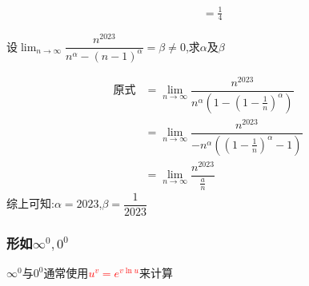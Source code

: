 \documentclass[8pt a4paper, oneside, UTF8]{ctexbook}
\begin{document}
\begin{sloppypar}
\begin{solution}
\begin{align*}
            & = \frac{1}{4}
        \end{align*}
    \end{solution}
    \begin{problem}
        设$\lim_{n\to\infty}\dfrac{n^{2023}}{n^{\alpha}-(n-1)^{\alpha}}=\beta\neq0$,求$\alpha$及$\beta$
    \end{problem}
    \begin{solution}
        \begin{align*}
          \text{原式} & = \lim_{n\to\infty} \dfrac{n^{2023}}{n^\alpha(1-(1-\frac{1}{n})^\alpha)}\\
          & = \lim_{n\to\infty} \dfrac{n^{2023}}{-n^\alpha((1-\frac{1}{n})^\alpha-1)}\\
          & = \lim_{n \to \infty} \dfrac{n^{2023}}{\frac{a}{n}}
        \end{align*}
        综上可知:$\alpha =2023$,$\beta=\dfrac{1}{2023}$
    \end{solution}
    \subsubsection{形如$\infty^0,0^0$}
          $\infty ^0$与$0^0$通常使用\textcolor{red}
              {$ u^v=e^{v \ln u}$}来计算

\end{sloppypar}
\end{document}
